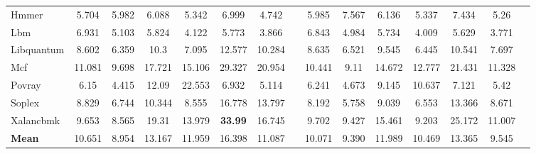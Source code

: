 \begin{table}
{\begin{tabular}{@{}l SSSSSS c@{\hspace{-0.9em}}  SSSSSS c   @{}}
    Hmmer       &5.704 &5.982  &6.088 &5.342  &6.999  &4.742   &&5.985 &7.567   &6.136 &5.337    &7.434&5.26   \\ %
    Lbm         &6.931 &5.103  &5.824 &4.122  &5.773  &3.866   &&6.843 &4.984   &5.734 &4.009    &5.629&3.771  \\ %
    Libquantum  &8.602 &6.359  &10.3  &7.095  &12.577 &10.284  &&8.635 &6.521   &9.545 &6.445    &10.541&7.697 \\ %
    Mcf         &11.081&9.698  &17.721&15.106 &29.327 &20.954  &&10.441&9.11    &14.672&12.777   &21.431&11.328\\ %
    Povray      &6.15  &4.415  &12.09 &22.553 &6.932  &5.114   &&6.241 &4.673   &9.145 &10.637   &7.121&5.42   \\ %
    Soplex      &8.829 &6.744  &10.344&8.555  &16.778 &13.797  &&8.192 &5.758   &9.039 &6.553    &13.366&8.671 \\ %
    Xalancbmk   &9.653 &8.565  &19.31 &13.979 &\textbf{33.99} &16.745  &&9.702 &9.427   &15.461&9.203    &25.172&11.007\\ %
    {\bf Mean}  &10.651&8.954  &13.167&11.959 &16.398 &11.087  &&10.071&9.390   &11.989&10.469   &13.365&9.545  \\ 
\bottomrule
\end{tabular}
}
\label{tab: P--States: PAAE, Standard deviation and Confidence for SPECcpu2006 benchmarks -- MIPS.}
\end{table}





